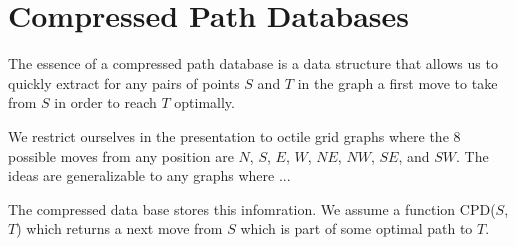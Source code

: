 \section{Compressed Path Databases}

The essence of a compressed path database is a data structure
that allows us to quickly extract for any pairs of points $S$ and $T$
in the graph a
first move to take from $S$ in order to reach $T$ optimally.

We restrict ourselves in the presentation to octile
grid graphs where the 8 possible moves from any position are
$N$, $S$, $E$, $W$, $NE$, $NW$, $SE$, and $SW$.
The ideas are generalizable to any graphs where ...

The compressed data base stores this infomration.
We assume a function \textsf{CPD}($S$,$T$) which returns a
next move from $S$ which is part of some optimal path to $T$.




